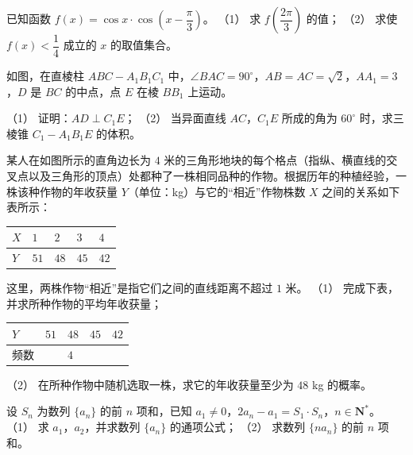 \begin{question}
已知函数 $f(x)=\cos x\cdot\cos\left(x-\dfrac\pi3\right)$。
（1） 求 $f\left(\dfrac{2\pi}3\right)$ 的值；
（2） 求使 $f(x)<\dfrac14$ 成立的 $x$ 的取值集合。
\Needspace{0.4\textheight}
\end{question}
\begin{question}
如图，在直棱柱 $ABC-A_1B_1C_1$ 中，$\angle BAC=90^\circ$，$AB=AC=\sqrt2$，$AA_1=3$，$D$ 是 $BC$ 的中点，点 $E$ 在棱 $BB_1$ 上运动。
\nopagebreak[4]
\begin{center}\end{center}
\nopagebreak[4]
（1） 证明：$AD\perp C_1E$；
（2） 当异面直线 $AC$，$C_1E$ 所成的角为 $60^\circ$ 时，求三棱锥 $C_1-A_1B_1E$ 的体积。
\Needspace{0.4\textheight}
\end{question}
\begin{question}
某人在如图所示的直角边长为 $4$ 米的三角形地块的每个格点（指纵、横直线的交叉点以及三角形的顶点）处都种了一株相同品种的作物。根据历年的种植经验，一株该种作物的年收获量 $Y$（单位：kg）与它的“相近”作物株数 $X$ 之间的关系如下表所示：
\nopagebreak[4]
\begin{center}\end{center}
\nopagebreak[4]
\begin{center}
\begin{tabular}{lllll}
\toprule
$X$ & $1$ & $2$ & $3$ & $4$ \\
\midrule
$Y$ & $51$ & $48$ & $45$ & $42$ \\
\bottomrule
\end{tabular}
\end{center}
这里，两株作物“相近”是指它们之间的直线距离不超过 $1$ 米。
（1） 完成下表，并求所种作物的平均年收获量；
\begin{center}
\begin{tabular}{lllll}
\toprule
$Y$ & $51$ & $48$ & $45$ & $42$ \\
\midrule
频数 &  & $4$ &  &  \\
\bottomrule
\end{tabular}
\end{center}
（2） 在所种作物中随机选取一株，求它的年收获量至少为 $48$ kg 的概率。
\end{question}
\begin{question}
设 $S_n$ 为数列 $\{a_n\}$ 的前 $n$ 项和，已知 $a_1\ne0$，$2a_n-a_1=S_1\cdot S_n$，$n\in\mathbf N^*$。
（1） 求 $a_1$，$a_2$，并求数列 $\{a_n\}$ 的通项公式；
（2） 求数列 $\{na_n\}$ 的前 $n$ 项和。
\end{question}
